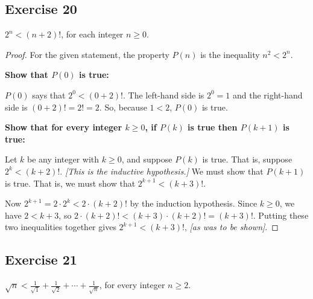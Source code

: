 \documentclass[14pt]{extarticle}
\newcommand{\dps}{\displaystyle}
\begin{document}
\subsection{Exercise 20}
$2^n < (n + 2)!$, for each integer $n \geq 0$.

\begin{proof}
For the given statement, the property $P(n)$ is the inequality $n^2 < 2^n$. 

{\bf Show that $P(0)$ is true:} 

$P(0)$ says that $2^0 < (0 + 2)!$. The left-hand side is $2^0 = 1$ and the right-hand side is $(0 + 2)! = 2! = 2$. So, because $1 < 2$, $P(0)$ is true. 

{\bf Show that for every integer $k \geq 0$, if $P(k)$ is true then $P(k + 1)$ is true:} 

Let $k$ be any integer with $k \geq 0$, and suppose $P(k)$ is true. That is, suppose $2^k < (k + 2)!$. {\it [This is the inductive hypothesis.]} We must show that $P(k + 1)$ is true. That is, we must show that $2^{k+1} < (k + 3)!$. 

Now $2^{k+1} = 2 \cdot 2^k < 2 \cdot (k+2)!$ by the induction hypothesis. Since $k \geq 0$, we have $2 < k+3$, so $2 \cdot (k+2)! < (k+3) \cdot (k+2)! = (k+3)!$. Putting these two inequalities together gives $2^{k+1} < (k+3)!$, {\it [as was to be shown]}.
\end{proof}

\subsection{Exercise 21}
$\dps \sqrt{n} < \frac{1}{\sqrt{1}} + \frac{1}{\sqrt{2}} + \cdots + \frac{1}{\sqrt{n}}$, for every integer $n \geq 2$.
\end{document}
